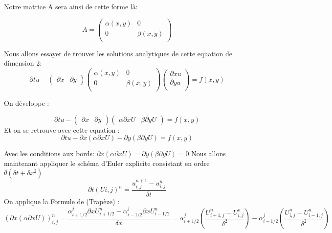 \documentclass[a4paper,12pt,twoside]{report}
\begin{document}
Notre matrice A sera ainsi de cette forme là:

\begin{equation}
A=\begin{pmatrix}\alpha(x,y)&0\\
0&\beta(x,y)\\\end{pmatrix}
 \end{equation}

Nous allons essayer de trouver les solutions analytiques de cette equation de dimension 2:
\begin{equation}
\partial{t} u -\begin{pmatrix}\partial{x} & \partial{y}
\end{pmatrix} \begin{pmatrix}\alpha(x,y)&0\\
0&\beta(x,y)\\\end{pmatrix} \begin{pmatrix}\partial{x}u\\
\partial{y}u\\
\end{pmatrix} =f(x,y)
\end{equation}

On développe :
 
\begin{equation}
\partial{t} u -\begin{pmatrix}\partial{x} & \partial{y}
\end{pmatrix}\begin{pmatrix}\alpha \partial{x}U & \beta\partial{y} U
\end{pmatrix}=f(x,y)
\end{equation}
Et on se retrouve avec cette equation :
\begin{equation}
\partial{t} u-\partial{x}(\alpha \partial{x}U)-\partial{y}(\beta \partial{y}U)=f(x,y)
\end{equation}

Avec les conditions aux bords:
$\partial{x}(\alpha \partial{x}U)=\partial{y}(\beta \partial{y}U)=0$
Nous allons maintenant appliquer le schéma d'Euler explicite consistant en ordre $\theta(\delta t +\delta x^2)$
\begin{equation}
\partial{t} (U{i,j} )^n=\frac{u_{i,j}^{n+1}-u_{i,j}^n}{\delta t}
\end{equation}
On applique la Formule de (Trapèze) :
\begin{equation}
(\partial{x}(\alpha \partial{x}U))_{i,j}^n=\frac{\alpha_{i+1/2}^j\partial{x}U_{i+1/2}^n-\alpha_{i-1/2}^j\partial{x}U_{i-1/2}^n}{\delta x}=\alpha_{i+1/2}^j(\frac{U_{i+1,j}^n-U_{i,j}^n}{\delta^2})-\alpha_{i-1/2}^j(\frac{U_{i,j}^n-U_{i-1,j}^n}{\delta^2})
\end{equation}
\end{document}
